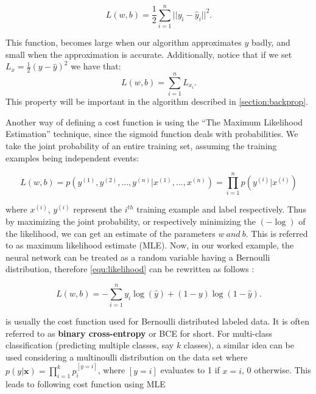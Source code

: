 \begin{equation}
  \label{equ:mse}
  L(w, b) = \frac{1}{2} \sum_{i = 1}^{n} ||y_{i} - \hat{y}_{i}||^2.
\end{equation}

This function, becomes large when our algorithm approximates $y$ badly, and small when the approximation is accurate. Additionally, notice that if we set $L_x = \frac{1}{2} (y - \hat{y})^2$ we have that:
\begin{equation}
  \label{equ:additivity}
  L(w,b) = \sum_{i = 1}^{n} L_{x_{i}}.
\end{equation}
This property will be important in the algorithm described in \cref{section:backprop}.

Another way of defining a cost function is using the ``The Maximum Likelihood Estimation'' technique, since the sigmoid function deals with probabilities. We take the joint probability of an entire training set, assuming the training examples being independent events:

\begin{equation}
  \label{equ:likelihood}
  L(w, b) = p(y^{(1)}, y^{(2)}, \ldots, y^{(n)} | x^{(1)}, \ldots, x^{(n)}) = \prod_{i=1}^{n} p(y^{(i)}|x^{(i)})
\end{equation}

where $x^{(i)}$, $y^{(i)}$ represent the $i^{th}$ training example and label respectively. Thus by maximizing the joint probability, or respectively minimizing the $(-\log)$ of the likelihood, we can get an estimate of the parameters $w \ and \ b $. This is referred to as maximum likelihood estimate (MLE). Now, in our worked example, the neural network can be treated as a random variable having a Bernoulli distribution, therefore \cref{equ:likelihood} can be rewritten as follows \cite{Ian16}:

\begin{equation}
  \label{equ:b_likelihood}
  L(w, b) = - \sum_{i = 1}^{n} y_i \log(\hat{y}) + (1 - y) \log(1 - \hat{y}).
\end{equation}

 is usually the cost function used for Bernoulli distributed labeled data. It is often referred to as \textbf{binary cross-entropy} or BCE for short. For multi-class classification (predicting multiple classes, say $k$ classes), a similar idea can be used considering a multinoulli distribution on the data set where $p(y | \textbf{x}) = \prod_{i = 1}^{k} p_i^{[y=i]}$, where $[y = i]$ evaluates to 1 if $x = i$, 0 otherwise. This leads to following cost function using MLE

